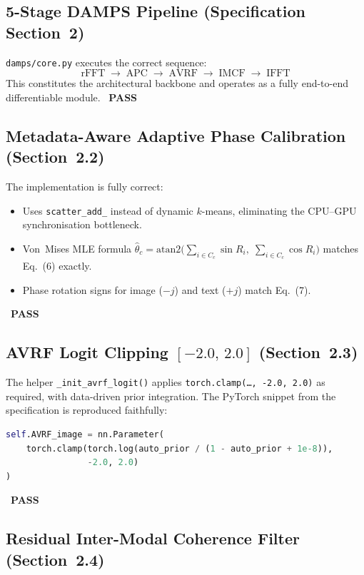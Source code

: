 \documentclass[12pt,a4paper]{article}
\newcommand{\PASS}{\textcolor{passgreen}{\ding{51}~\textbf{PASS}}}
\begin{document}
\subsection{5-Stage DAMPS Pipeline (Specification Section~2)}

\texttt{damps/core.py} executes the correct sequence:
\[
  \text{rFFT} \;\longrightarrow\; \text{APC} \;\longrightarrow\; \text{AVRF}
  \;\longrightarrow\; \text{IMCF} \;\longrightarrow\; \text{IFFT}
\]
This constitutes the architectural backbone and operates as a fully
end-to-end differentiable module.  \PASS

\subsection{Metadata-Aware Adaptive Phase Calibration (Section~2.2)}

The implementation is fully correct:
\begin{itemize}[noitemsep]
  \item Uses \texttt{scatter\_add\_} instead of dynamic $k$-means, eliminating
        the CPU--GPU synchronisation bottleneck.
  \item Von~Mises MLE formula
        $\hat{\theta}_c = \mathrm{atan2}\!\bigl(\sum_{i\in C_c}\sin R_i,\;
        \sum_{i\in C_c}\cos R_i\bigr)$ matches Eq.~(6) exactly.
  \item Phase rotation signs for image ($-j$) and text ($+j$) match Eq.~(7).
\end{itemize}
\PASS

\subsection{AVRF Logit Clipping \texorpdfstring{$[-2.0,\,2.0]$}{[-2.0,2.0]} (Section~2.3)}

The helper \texttt{\_init\_avrf\_logit()} applies
\texttt{torch.clamp(\ldots,\,-2.0,\,2.0)} as required, with data-driven prior
integration.  The PyTorch snippet from the specification is reproduced
faithfully:

\begin{lstlisting}[language=Python]
self.AVRF_image = nn.Parameter(
    torch.clamp(torch.log(auto_prior / (1 - auto_prior + 1e-8)),
                -2.0, 2.0)
)
\end{lstlisting}
\PASS

\subsection{Residual Inter-Modal Coherence Filter (Section~2.4)}
\end{document}
